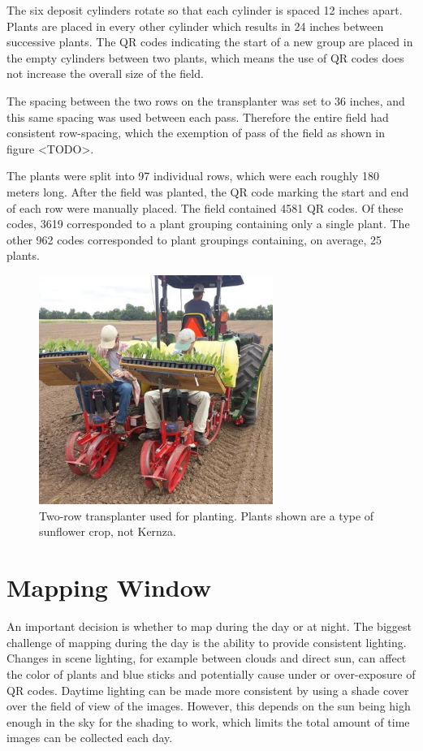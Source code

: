 The six deposit cylinders rotate so that each cylinder is spaced 12 inches apart.  Plants are placed in every other cylinder which results in 24 inches between successive plants.  The QR codes indicating the start of a new group are placed in the empty cylinders between two plants, which means the use of QR codes does not increase the overall size of the field. 
 
The spacing between the two rows on the transplanter was set to 36 inches, and this same spacing was used between each pass.  Therefore the entire field had consistent row-spacing, which the exemption of pass of the field as shown in figure <TODO>. 

The plants were split into 97 individual rows, which were each roughly 180 meters long.  After the field was planted, the QR code marking the start and end of each row were manually placed.  The field contained 4581 QR codes.  Of these codes, 3619 corresponded to a plant grouping containing only a single plant.  The other 962 codes corresponded to plant groupings containing, on average, 25 plants.  

\begin{figure}[htb]
	\centering
    \includegraphics[width=3in]{figures/transplanter.jpg}
    \caption[Transplanter]{Two-row transplanter used for planting. Plants shown are a type of sunflower crop, not Kernza.}
    \label{figure:transplanter}
\end{figure}  

\section{Mapping Window}

An important decision is whether to map during the day or at night.  The biggest challenge of mapping during the day is the ability to provide consistent lighting.  Changes in scene lighting, for example between clouds and direct sun, can affect the color of plants and blue sticks and potentially cause under or over-exposure of QR codes.  Daytime lighting can be made more consistent by using a shade cover over the field of view of the images.  However, this depends on the sun being high enough in the sky for the shading to work, which limits the total amount of time images can be collected each day.  

